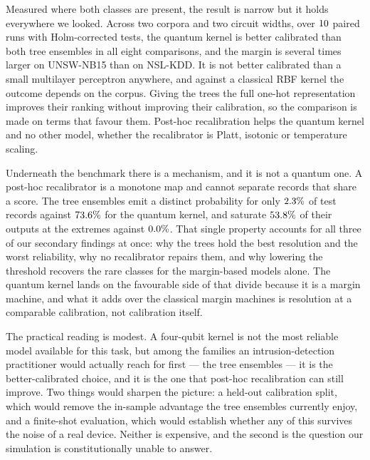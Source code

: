 \documentclass[journal]{IEEEtran}
\begin{document}
Measured where both classes are present, the result is narrow but it holds
everywhere we looked. Across two corpora and two circuit widths, over
$10$ paired runs with Holm-corrected tests, the quantum kernel is
better calibrated than both tree ensembles in all eight comparisons, and the
margin is several times larger on UNSW-NB15 than on NSL-KDD. It is not
better calibrated than a small multilayer perceptron anywhere, and against a
classical RBF kernel the outcome depends on the corpus. Giving the trees the
full one-hot representation improves their ranking without improving their
calibration, so the comparison is made on terms that favour them. Post-hoc
recalibration helps the quantum kernel and no other model, whether the
recalibrator is Platt, isotonic or temperature scaling.

Underneath the benchmark there is a mechanism, and it is not a quantum one.
A post-hoc recalibrator is a monotone map and cannot separate records that
share a score. The tree ensembles emit a distinct probability for only
$2.3\%$ of test records against $73.6\%$ for the
quantum kernel, and saturate $53.8\%$ of their outputs at the extremes
against $0.0\%$. That single property accounts for all three of
our secondary findings at once: why the trees hold the best resolution and
the worst reliability, why no recalibrator repairs them, and why lowering
the threshold recovers the rare classes for the margin-based models alone.
The quantum kernel lands on the favourable side of that divide because it
is a margin machine, and what it adds over the classical margin machines is
resolution at a comparable calibration, not calibration itself.

The practical reading is modest. A four-qubit kernel is not the most
reliable model available for this task, but among the families an
intrusion-detection practitioner would actually reach for first --- the tree
ensembles --- it is the better-calibrated choice, and it is the one that
post-hoc recalibration can still improve. Two things would sharpen the
picture: a held-out calibration split, which would remove the in-sample
advantage the tree ensembles currently enjoy, and a finite-shot evaluation,
which would establish whether any of this survives the noise of a real
device. Neither is expensive, and the second is the question our simulation
is constitutionally unable to answer.

\end{document}
